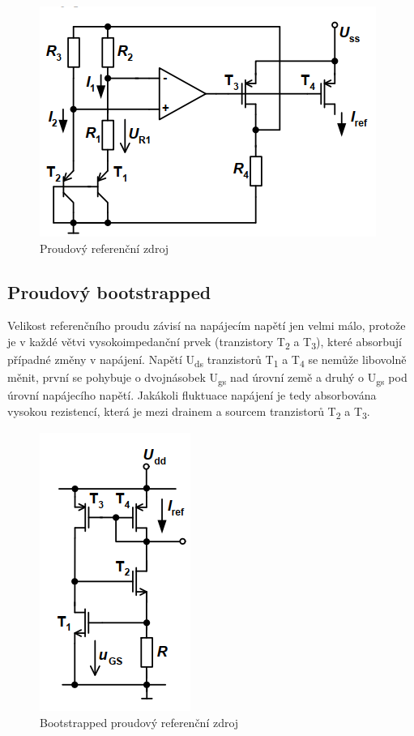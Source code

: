 \begin{figure}[h]
   \begin{center}
     \includegraphics[scale=0.6]{images/PRZ.png}
   \end{center}
   \caption{Proudový referenční zdroj}
\end{figure}


\subsection{Proudový bootstrapped}
Velikost referenčního proudu závisí na napájecím napětí jen velmi málo, protože je v každé větvi vysokoimpedanční prvek (tranzistory T\textsubscript{2} a T\textsubscript{3}), které absorbují případné změny v napájení. Napětí U\textsubscript{ds} tranzistorů T\textsubscript{1} a T\textsubscript{4} se nemůže libovolně měnit, první se pohybuje o dvojnásobek U\textsubscript{gs} nad úrovní země a druhý o U\textsubscript{gs} pod úrovní napájecího napětí. Jakákoli fluktuace napájení je tedy absorbována vysokou rezistencí, která je mezi drainem a sourcem tranzistorů T\textsubscript{2} a T\textsubscript{3}.

\begin{figure}[h]
   \begin{center}
     \includegraphics[scale=0.6]{images/BTI.png}
   \end{center}
   \caption{Bootstrapped proudový referenční zdroj}
\end{figure}

